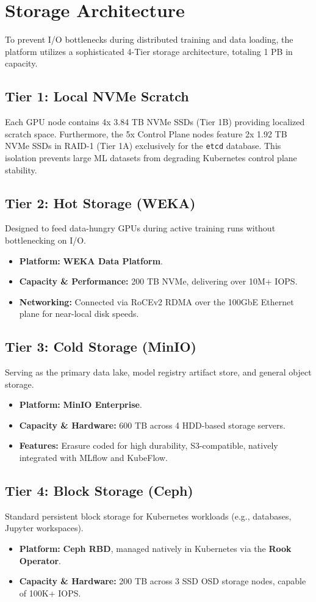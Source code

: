 \chapter{Storage Architecture}

To prevent I/O bottlenecks during distributed training and data loading, the platform utilizes a sophisticated 4-Tier storage architecture, totaling 1 PB in capacity.

\section{Tier 1: Local NVMe Scratch}
Each GPU node contains 4x 3.84 TB NVMe SSDs (Tier 1B) providing localized scratch space. Furthermore, the 5x Control Plane nodes feature 2x 1.92 TB NVMe SSDs in RAID-1 (Tier 1A) exclusively for the \texttt{etcd} database. This isolation prevents large ML datasets from degrading Kubernetes control plane stability.

\section{Tier 2: Hot Storage (WEKA)}
Designed to feed data-hungry GPUs during active training runs without bottlenecking on I/O.
\begin{itemize}
    \item \textbf{Platform:} \textbf{WEKA Data Platform}.
    \item \textbf{Capacity \& Performance:} 200 TB NVMe, delivering over 10M+ IOPS.
    \item \textbf{Networking:} Connected via RoCEv2 RDMA over the 100GbE Ethernet plane for near-local disk speeds.
\end{itemize}

\section{Tier 3: Cold Storage (MinIO)}
Serving as the primary data lake, model registry artifact store, and general object storage.
\begin{itemize}
    \item \textbf{Platform:} \textbf{MinIO Enterprise}.
    \item \textbf{Capacity \& Hardware:} 600 TB across 4 HDD-based storage servers.
    \item \textbf{Features:} Erasure coded for high durability, S3-compatible, natively integrated with MLflow and KubeFlow.
\end{itemize}

\section{Tier 4: Block Storage (Ceph)}
Standard persistent block storage for Kubernetes workloads (e.g., databases, Jupyter workspaces).
\begin{itemize}
    \item \textbf{Platform:} \textbf{Ceph RBD}, managed natively in Kubernetes via the \textbf{Rook Operator}.
    \item \textbf{Capacity \& Hardware:} 200 TB across 3 SSD OSD storage nodes, capable of 100K+ IOPS.
\end{itemize}
